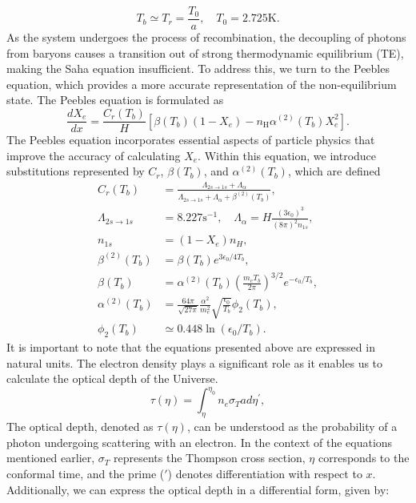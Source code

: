 \documentclass{aa}
\begin{document}
\begin{equation}\label{eq: T_b}
    T_{b} \simeq T_{r}=\frac{T_{0}}{a}, \quad T_{0}=2.725 \mathrm{K}.
\end{equation}
As the system undergoes the process of recombination, the decoupling of photons from baryons causes a transition out of strong thermodynamic equilibrium (TE), making the Saha equation insufficient. To address this, we turn to the Peebles equation, which provides a more accurate representation of the non-equilibrium state. The Peebles equation is formulated as
\begin{equation}\label{eq: peeble}
    \frac{d X_{e}}{d
    x}=\frac{C_{r}\left(T_{b}\right)}{H}\left[\beta\left(T_{b}\right)\left(1-
    X_{e}\right)-n_{\mathrm{H}} \alpha^{(2)}\left(T_{b}\right)
    X_{e}^{2}\right].
\end{equation}
The Peebles equation incorporates essential aspects of particle physics that improve the accuracy of calculating $X_e$. Within this equation, we introduce substitutions represented by $C_r$, $\beta(T_b)$, and $\alpha^{(2)}(T_b)$, which are defined
\begin{align}\label{eq: subs}
    C_{r}\left(T_{b}\right)&=\frac{\Lambda_{2 s \rightarrow 1
    s}+\Lambda_{\alpha}}{\Lambda_{2 s \rightarrow 1
    s}+\Lambda_{\alpha}+\beta^{(2)}\left(T_{b}\right)}, \\
    \Lambda_{2 s \rightarrow 1 s}&=8.227 \mathrm{s}^{-1}, \quad
    \Lambda_{\alpha}=H \frac{\left(3 \epsilon_{0}\right)^{3}}{(8 \pi)^{2} n_{1
    s}},\\
    n_{1 s} &=\left(1-X_{e}\right) n_{H}, \\ \beta^{(2)}\left(T_{b}\right)
    &=\beta\left(T_{b}\right) e^{3 \epsilon_{0} / 4 T_{b}},\\
    \beta\left(T_{b}\right)&=\alpha^{(2)}\left(T_{b}\right)\left(\frac{m_{e}
    T_{b}}{2 \pi}\right)^{3 / 2} e^{-\epsilon_{0} / T_{b}},\\
    \alpha^{(2)}\left(T_{b}\right)&=\frac{64 \pi}{\sqrt{27 \pi}}
    \frac{\alpha^{2}}{m_{e}^{2}} \sqrt{\frac{\epsilon_{0}}{T_{b}}}
    \phi_{2}\left(T_{b}\right),\\
    \phi_{2}\left(T_{b}\right) &\simeq 0.448 \ln \left(\epsilon_{0} /
    T_{b}\right).
\end{align}
It is important to note that the equations presented above are expressed in natural units. The electron density plays a significant role as it enables us to calculate the optical depth of the Universe.
\begin{equation}\label{eq: tau}
    \tau(\eta)=\int_{\eta}^{\eta_{0}} n_{e} \sigma_{T} a d \eta^{\prime},
\end{equation}
The optical depth, denoted as $\tau(\eta)$, can be understood as the probability of a photon undergoing scattering with an electron. In the context of the equations mentioned earlier, $\sigma_T$ represents the Thompson cross section, $\eta$ corresponds to the conformal time, and the prime ($'$) denotes differentiation with respect to $x$. Additionally, we can express the optical depth in a differential form, given by:
\end{document}
